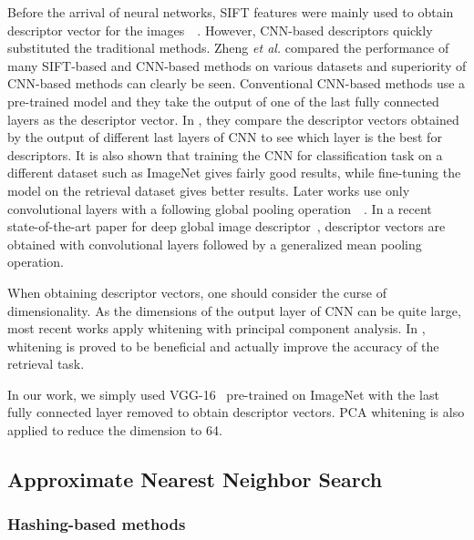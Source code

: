 Before the arrival of neural networks, SIFT features were mainly used to obtain descriptor vector for the images~\cite{philbin2007object}~\cite{jegou2010aggregating}. 
However, CNN-based descriptors quickly substituted the traditional methods. 
Zheng \emph{et al.} compared the performance of many SIFT-based and CNN-based methods on various datasets and superiority of CNN-based methods can clearly be seen. 
Conventional CNN-based methods use a pre-trained model and they take the output of one of the last fully connected layers as the descriptor vector. 
In \cite{babenko2014neural}, they compare the descriptor vectors obtained by the output of different last layers of CNN to see which layer is the best for descriptors.
It is also shown that training the CNN for classification task on a different dataset such as ImageNet gives fairly good results, while fine-tuning the model on the retrieval dataset gives better results.
Later works use only convolutional layers with a following global pooling operation~\cite{razavian2016visual}~\cite{tolias2015particular}. 
In a recent state-of-the-art paper for deep global image descriptor~\cite{radenovic2018fine}, descriptor vectors are obtained with convolutional layers followed by a generalized mean pooling operation.

When obtaining descriptor vectors, one should consider the curse of dimensionality. 
As the dimensions of the output layer of CNN can be quite large, most recent works apply whitening with principal component analysis. 
In \cite{jegou2012negative}, whitening is proved to be beneficial and actually improve the accuracy of the retrieval task.

In our work, we simply used VGG-16~\cite{simonyan2014very} pre-trained on ImageNet with the last fully connected layer removed to obtain descriptor vectors. PCA whitening is also applied to reduce the dimension to 64.

\subsection{Approximate Nearest Neighbor Search}

\subsubsection*{Hashing-based methods}

